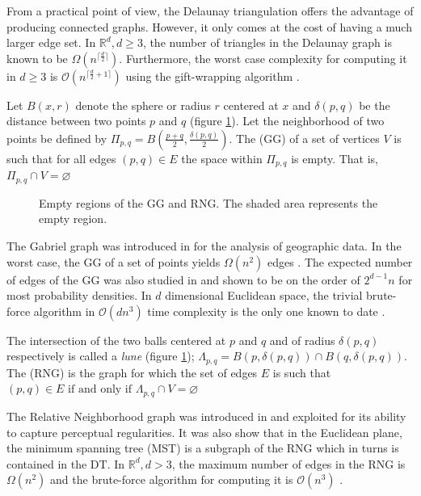 From a practical point of view, the Delaunay triangulation offers the advantage of
producing connected graphs. However, it only comes at the cost of having a much larger edge set. In $\mathbb{R}^d, d \geq 3$, the number of triangles in the Delaunay graph is known to be $\Omega(n^{\lceil\frac{d}{2} \rceil})$. Furthermore, the worst case complexity for computing it in $d \geq 3$ is $\mathcal{O}(n^{\lceil\frac{d}{2} +1 \rceil})$ using the gift-wrapping algorithm \cite{Fortune1997}.

\begin{defn}
Let $B(x, r)$ denote the sphere or radius $r$ centered at $x$ and $\delta(p,q)$ be the distance between two points $p$ and $q$ (figure \ref{fig:erg-construct}). Let the neighborhood of two points be defined by $\Pi_{p,q} = B(\frac{p+q}{2}, \frac{\delta(p, q)}{2})$. The  (GG) of a set of vertices $V$ is such that for all edges $(p, q) \in E$  the space within $\Pi_{p,q}$ is empty. That is, $\Pi_{p,q} \cap V = \varnothing$
\end{defn}

\begin{figure}[ht]
\centering
\subbottom[GG]{%
}
\subbottom[RNG]{
}
\caption{Empty regions of the GG and RNG. The shaded area represents the empty region.}
\label{fig:erg-construct}
\end{figure}

The Gabriel graph was introduced in \cite{Gabriel1969} for the analysis of geographic data. In the worst case, the GG of a set of points yields $\Omega(n^2)$ edges \cite{Toussaint1992}. The expected number of edges of the GG was also studied in \cite{Devroye1988} and shown to be on the order of $2^{d-1}n$ for most probability densities. In $d$ dimensional Euclidean space, the trivial brute-force algorithm in $\mathcal{O}(dn^3)$ time complexity is the only one known to date \cite{Toussaint2012}.

\begin{defn}
The intersection of the two balls centered at $p$ and $q$ and of radius $\delta(p,q)$ respectively is called a \textit{lune} (figure \ref{fig:erg-construct}); $\Lambda_{p,q} = B(p, \delta(p,q)) \cap B(q, \delta(p,q))$. The  (RNG) is the graph for which the set of edges $E$ is such that $(p,q) \in E 	\text{ if and only if } \Lambda_{p,q} \cap V = \varnothing$ 
\end{defn}

The Relative Neighborhood graph was introduced in \cite{Toussaint1980} and exploited for its ability to capture perceptual regularities. It was also show that in the Euclidean plane, the minimum spanning tree (MST) is a subgraph of the RNG which in turns is contained in the DT. In $\mathbb{R}^d, d > 3$, the maximum number of edges in the RNG is $\Omega(n^2)$ \cite{Toussaint1992} and the brute-force algorithm for computing it is $\mathcal{O}(n^3)$ \cite{Toussaint1980}.

